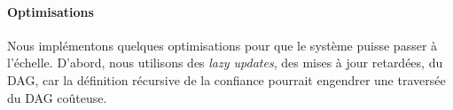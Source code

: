 \documentclass[a4,twocolumn,10pt]{article}
\newcommand{\tronly}[2]{#1}
\theoremstyle{definition}
\begin{document}
%
%
%

\paragraph{Optimisations}
Nous implémentons quelques optimisations pour que le système puisse passer à l'échelle.
D'abord, nous utilisons des \emph{lazy updates}, des mises à jour retardées, du DAG, car la définition récursive de la confiance pourrait engendrer une traversée du DAG coûteuse.
\end{document}
